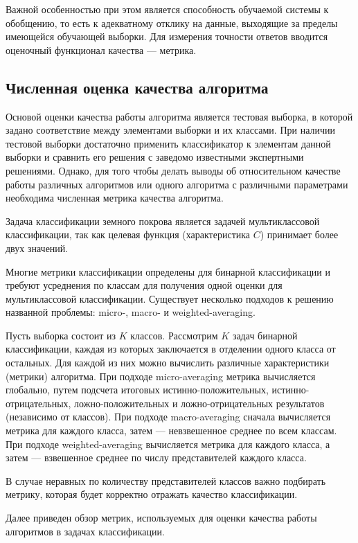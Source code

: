 \documentclass[14pt, a4paper, oneside]{extarticle}
\begin{document}
Важной особенностью при этом является способность обучаемой системы к обобщению, то есть к адекватному отклику на данные, выходящие за пределы имеющейся обучающей выборки. Для измерения точности ответов вводится оценочный функционал качества --- метрика.

\subsection{Численная оценка качества алгоритма}
Основой оценки качества работы алгоритма является тестовая выборка, в которой задано соответствие между элементами выборки и их классами. При наличии тестовой выборки достаточно применить классификатор к элементам данной выборки и сравнить его решения с заведомо известными экспертными решениями. Однако, для того чтобы делать выводы об относительном качестве работы различных алгоритмов или одного алгоритма с различными параметрами необходима численная метрика качества алгоритма.

Задача классификации земного покрова является задачей мультиклассовой классификации, так как целевая функция (характеристика $C$) принимает более двух значений.

Многие метрики классификации определены для бинарной классификации и требуют усреднения по классам для получения одной оценки для мультиклассовой классификации. Существует несколько подходов к решению названной проблемы: micro-, macro- и weighted-averaging.

Пусть выборка состоит из $K$ классов. Рассмотрим $K$ задач бинарной классификации, каждая из которых заключается в отделении одного класса от остальных. Для каждой из них можно вычислить различные характеристики (метрики) алгоритма. При подходе micro-averaging метрика вычисляется глобально, путем подсчета итоговых истинно-положительных, истинно-отрицательных, ложно-положительных и ложно-отрицательных результатов (независимо от классов). При подходе macro-averaging сначала вычисляется метрика для каждого класса, затем --- невзвешенное среднее по всем классам. При подходе weighted-averaging вычисляется метрика для каждого класса, а затем --- взвешенное среднее по числу представителей каждого класса.

В случае неравных по количеству представителей классов важно подбирать метрику, которая будет корректно отражать качество классификации.

Далее приведен обзор метрик, используемых для оценки качества работы алгоритмов в задачах классификации.
\end{document}
